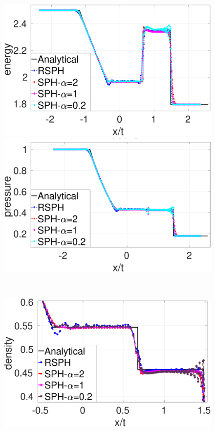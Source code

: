 \begin{figure}[htp]
\begin{minipage}{.495\textwidth}
        \includegraphics[width=0.99 \textwidth]{Chapter-4/Figures/Sod/RCM-Sod-SPH-alf-e}
    \end{minipage}%
    \begin{minipage}{.495 \textwidth}
        \centering
        \includegraphics[width=0.99 \textwidth]{Chapter-4/Figures/Sod/RCM-Sod-SPH-alf-p}
    \end{minipage}%
    \\
    \begin{minipage}{.495\textwidth}
        \centering
        \includegraphics[width=0.99 \textwidth]{Chapter-4/Figures/Sod/RCM-Sod-SPH-alf-rho-zoom}

\end{minipage}
\end{figure}
